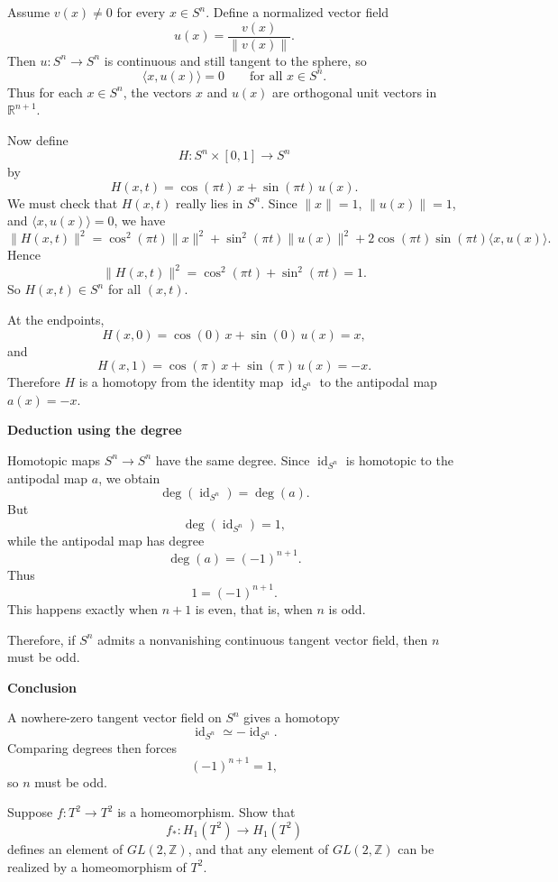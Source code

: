 \begin{solution}
Assume \(v(x)\neq 0\) for every \(x\in S^n\). Define a normalized vector field
\[
u(x)=\frac{v(x)}{\|v(x)\|}.
\]
Then \(u:S^n\to S^n\) is continuous and still tangent to the sphere, so
\[
\langle x,u(x)\rangle =0
\qquad\text{for all }x\in S^n.
\]
Thus for each \(x\in S^n\), the vectors \(x\) and \(u(x)\) are orthogonal unit vectors in \(\mathbb R^{n+1}\).

Now define
\[
H:S^n\times [0,1]\to S^n
\]
by
\[
H(x,t)=\cos(\pi t)\,x+\sin(\pi t)\,u(x).
\]
We must check that \(H(x,t)\) really lies in \(S^n\). Since \(\|x\|=1\), \(\|u(x)\|=1\), and \(\langle x,u(x)\rangle =0\), we have
\[
\|H(x,t)\|^2
=
\cos^2(\pi t)\|x\|^2
+
\sin^2(\pi t)\|u(x)\|^2
+
2\cos(\pi t)\sin(\pi t)\langle x,u(x)\rangle.
\]
Hence
\[
\|H(x,t)\|^2
=
\cos^2(\pi t)+\sin^2(\pi t)=1.
\]
So \(H(x,t)\in S^n\) for all \((x,t)\).

At the endpoints,
\[
H(x,0)=\cos(0)\,x+\sin(0)\,u(x)=x,
\]
and
\[
H(x,1)=\cos(\pi)\,x+\sin(\pi)\,u(x)=-x.
\]
Therefore \(H\) is a homotopy from the identity map \(\operatorname{id}_{S^n}\) to the antipodal map \(a(x)=-x\).


\medskip
\noindent\textbf{Deduction using the degree}\par
\smallskip


Homotopic maps \(S^n\to S^n\) have the same degree. Since \(\operatorname{id}_{S^n}\) is homotopic to the antipodal map \(a\), we obtain
\[
\deg(\operatorname{id}_{S^n})=\deg(a).
\]
But
\[
\deg(\operatorname{id}_{S^n})=1,
\]
while the antipodal map has degree
\[
\deg(a)=(-1)^{n+1}.
\]
Thus
\[
1=(-1)^{n+1}.
\]
This happens exactly when \(n+1\) is even, that is, when \(n\) is odd.

Therefore, if \(S^n\) admits a nonvanishing continuous tangent vector field, then \(n\) must be odd.


\medskip
\noindent\textbf{Conclusion}\par
\smallskip


A nowhere-zero tangent vector field on \(S^n\) gives a homotopy
\[
\operatorname{id}_{S^n}\simeq -\operatorname{id}_{S^n}.
\]
Comparing degrees then forces
\[
(-1)^{n+1}=1,
\]
so \(n\) must be odd.
\end{solution}

\begin{problem}
Suppose \(f:T^2\to T^2\) is a homeomorphism. Show that
\[
f_*:H_1(T^2)\to H_1(T^2)
\]
defines an element of \(GL(2,\mathbb Z)\), and that any element of \(GL(2,\mathbb Z)\) can be realized by a homeomorphism of \(T^2\).

\par
\end{problem}

